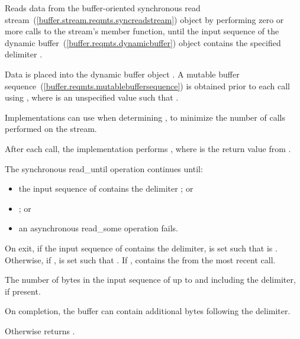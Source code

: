\begin{itemdescr}
\pnum
\effects Reads data from the buffer-oriented synchronous read stream~(\ref{buffer.stream.reqmts.syncreadstream}) object  by performing zero or more calls to the stream's  member function, until the input sequence of the dynamic buffer~(\ref{buffer.reqmts.dynamicbuffer}) object  contains the specified delimiter .

\pnum
Data is placed into the dynamic buffer object . A mutable buffer sequence~(\ref{buffer.reqmts.mutablebuffersequence}) is obtained prior to each  call using , where  is an unspecified value such that . \begin{note} Implementations can use  when determining , to minimize the number of  calls performed on the stream. \end{note} After each  call, the implementation performs , where  is the return value from .

\pnum
The synchronous read_until operation continues until:

\begin{itemize}
\item
the input sequence of  contains the delimiter ; or
\item
{}; or
\item
an asynchronous read_some operation fails.
\end{itemize}

\pnum
On exit, if the input sequence of  contains the delimiter,  is set such that  is . Otherwise, if ,  is set such that . If ,  contains the  from the most recent  call.

\pnum
\returns The number of bytes in the input sequence of  up to and including the delimiter, if present. \begin{note} On completion, the buffer can contain additional bytes following the delimiter. \end{note} Otherwise returns .
\end{itemdescr}



